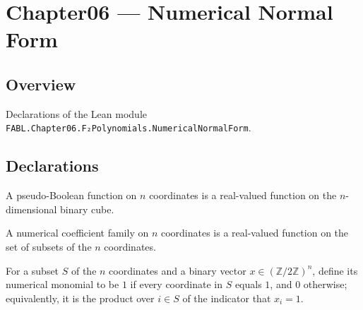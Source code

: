 \chapter{Chapter06 — Numerical Normal Form}
\section{Overview}

Declarations of the Lean module \texttt{FABL.Chapter06.F₂Polynomials.NumericalNormalForm}.

\section{Declarations}

\begin{definition}
\label{FABL.PseudoBooleanFunction}
\leanok
{}
A pseudo-Boolean function on $n$ coordinates is a real-valued function on the
$n$-dimensional binary cube.
\end{definition}

\begin{definition}
\label{FABL.NumericalCoefficients}
\leanok
A numerical coefficient family on $n$ coordinates is a real-valued function on the set
of subsets of the $n$ coordinates.
\end{definition}

\begin{definition}
\label{FABL.numericalMonomial}
\leanok
{}
For a subset $S$ of the $n$ coordinates and a binary vector
$x\in(\mathbb{Z}/2\mathbb{Z})^n$, define its numerical monomial to be $1$ if every
coordinate in $S$ equals $1$, and $0$ otherwise; equivalently, it is the product over
$i\in S$ of the indicator that $x_i=1$.
\end{definition}

